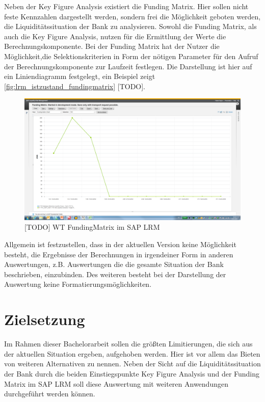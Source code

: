 Neben der Key Figure Analysis existiert die Funding Matrix. Hier sollen nicht feste Kennzahlen dargestellt werden, sondern frei die Möglichkeit geboten werden, die Liquiditätssituation der Bank zu analysieren. Sowohl die Funding Matrix, als auch die Key Figure Analysis, nutzen für die Ermittlung der Werte die Berechnungskomponente. Bei der Funding Matrix hat der Nutzer die Möglichkeit,die Selektionskriterien in Form der nötigen Parameter für den Aufruf der Berechnungskomponente zur Laufzeit festlegen. Die Darstellung ist hier auf ein Liniendiagramm festgelegt, ein Beispiel zeigt  \vref{fig:lrm_istzustand_fundingmatrix} [TODO].

\begin{figure}[h]
\centering
\setlength{\unitlength}{1mm}
\includegraphics[width=15cm]{images/Funding_Matrix_Example.png}
\caption{[TODO] WT FundingMatrix im SAP LRM\label{fig:lrm_istzustand_fundingmatrix}}
\end{figure}

Allgemein ist festzustellen, dass in der aktuellen Version keine Möglichkeit besteht, die Ergebnisse der Berechnungen in irgendeiner Form in anderen Auswertungen, z.B. Auswertungen die die gesamte Situation der Bank beschrieben, einzubinden. Des weiteren besteht bei der Darstellung der Auswertung keine Formatierungsmöglichkeiten.

\section{Zielsetzung}

Im Rahmen dieser Bachelorarbeit sollen die größten Limitierungen, die sich aus der aktuellen Situation ergeben, aufgehoben werden. Hier ist vor allem das Bieten von weiteren Alternativen zu nennen. Neben der Sicht auf die Liquiditätssituation der Bank durch die beiden Einstiegspunkte Key Figure Analysis und der Funding Matrix im SAP LRM soll diese Auswertung mit weiteren Anwendungen durchgeführt werden können.

